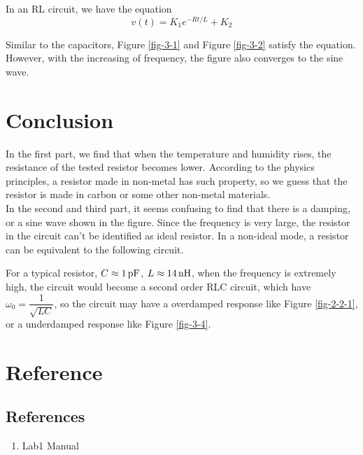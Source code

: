 \documentclass{article}
\newcommand{\unit}[1]{{\rm\,#1}}
\begin{document}
In an RL circuit, we have the equation$$v(t)=K_1e^{-Rt/L}+K_2$$

Similar to the capacitors, Figure \ref{fig-3-1} and Figure \ref{fig-3-2} satisfy the equation. However, with the increasing of frequency, the figure also converges to the sine wave.

\newpage

\section{Conclusion}

In the first part, we find that when the temperature and humidity rises, the resistance of the tested resistor becomes lower. According to the physics principles, a resistor made in non-metal has such property, so we guess that the resistor is made in carbon or some other non-metal materials.\\

In the second and third part, it seems confusing to find that there is a damping, or a sine wave shown in the figure. Since the frequency is very large, the resistor in the circuit can't be identified as ideal resistor. In a non-ideal mode, a resistor can be equivalent to the following circuit.

\begin{center}
\end{center}

For a typical resistor, $C\approx1\unit{pF}$, $L\approx14\unit{nH}$, when the frequency is extremely high, the circuit would become a second order RLC circuit, which have $\omega_0=\dfrac{1}{\sqrt{LC}}$, so the circuit may have a overdamped response like Figure \ref{fig-2-2-1}, or a underdamped response like Figure \ref{fig-3-4}.

\section{Reference}

\subsection{References}
\begin{enumerate}
	\item Lab1 Manual
\end{enumerate}
\end{document}
